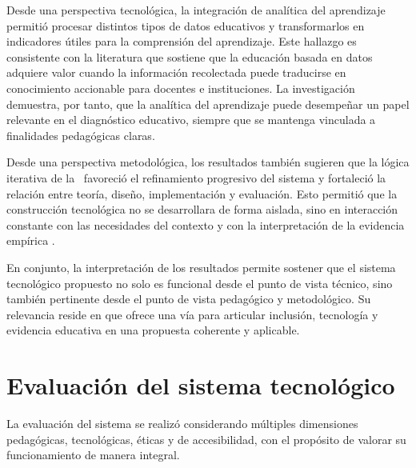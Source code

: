 \begin{refsection}
Desde una perspectiva tecnológica, la integración de analítica del aprendizaje permitió procesar distintos tipos de datos educativos y transformarlos en indicadores útiles para la comprensión del aprendizaje. Este hallazgo es consistente con la literatura que sostiene que la educación basada en datos adquiere valor cuando la información recolectada puede traducirse en conocimiento accionable para docentes e instituciones. La investigación demuestra, por tanto, que la analítica del aprendizaje puede desempeñar un papel relevante en el diagnóstico educativo, siempre que se mantenga vinculada a finalidades pedagógicas claras.

Desde una perspectiva metodológica, los resultados también sugieren que la lógica iterativa de la \DBR\ favoreció el refinamiento progresivo del sistema y fortaleció la relación entre teoría, diseño, implementación y evaluación. Esto permitió que la construcción tecnológica no se desarrollara de forma aislada, sino en interacción constante con las necesidades del contexto y con la interpretación de la evidencia empírica \parencite{wang2005}.

En conjunto, la interpretación de los resultados permite sostener que el sistema tecnológico propuesto no solo es funcional desde el punto de vista técnico, sino también pertinente desde el punto de vista pedagógico y metodológico. Su relevancia reside en que ofrece una vía para articular inclusión, tecnología y evidencia educativa en una propuesta coherente y aplicable.

\section{Evaluación del sistema tecnológico}

La evaluación del sistema se realizó considerando múltiples dimensiones pedagógicas, tecnológicas, éticas y de accesibilidad, con el propósito de valorar su funcionamiento de manera integral.


\end{refsection}
